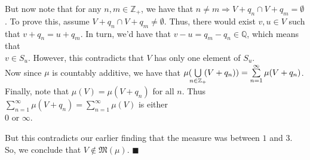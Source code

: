 \documentclass{book}
\newenvironment{myIndent}{%
   \begin{adjustwidth}{2.5em}{0em}%
}{%
   \end{adjustwidth}%
}
\newcommand{\mySepTwo}[1][.]{%
   {\noindent\color{#1}{\rule{6.5in}{0.5mm}}}\\%
}
\newcommand{\retTwo}{\hfill\bigbreak}
\begin{document}
\begin{myIndent}
      But now note that for any $n, m \in \mathbb{Z}_+$, we have that $n \neq m \Longrightarrow V + q_n \cap V + q_m = \emptyset$. To prove this, assume $V + q_n \cap V + q_m \neq \emptyset$. Thus, there would exist $v, u \in V$ such that $v + q_n = u + q_m$. In turn, we'd have that $v - u = q_m - q_n \in \mathbb{Q}$, which means that\\ $v \in S_u$. However, this contradicts that $V$ has only one element of $S_u$.\\ [-4pt]

      Now since $\mu$ is countably additive, we have that $\mu(\hspace{-0.3em}\bigcup\limits_{n \in \mathbb{Z}_+}\hspace{-0.3em}(V + q_n)) = \sum\limits_{n = 1}^\infty \mu(V + q_n)$.\\
      
      Finally, note that $\mu(V) = \mu(V + q_n)$ for all $n$. Thus $\sum\limits_{n = 1}^\infty \mu(V + q_n) = \sum\limits_{n = 1}^\infty \mu(V)$ is either\\ [-6pt] $0$ or $\infty$.\retTwo
      
      But this contradicts our earlier finding that the measure was between $1$ and $3$. So, we conclude that $V \notin \mathfrak{M}(\mu)$. $\blacksquare$
   \end{myIndent}

   \mySepTwo 
\end{document}
